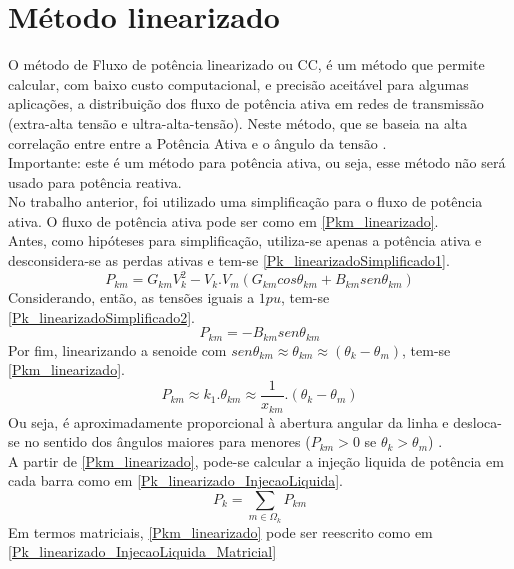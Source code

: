 \section{Método linearizado}
\label{SecaoMetodoLinearizado}
O método de Fluxo de potência linearizado ou CC, é um método que permite calcular, com baixo custo computacional, e precisão aceitável para algumas aplicações, a distribuição dos fluxo de potência ativa em redes de transmissão (extra-alta tensão e ultra-alta-tensão). Neste método, que se baseia na alta correlação entre entre a Potência Ativa e o ângulo da tensão \cite{raphael}.\\
Importante: este é um método para potência ativa, ou seja, esse método não será usado para potência reativa.\\
No trabalho anterior, foi utilizado uma simplificação para o fluxo de potência ativa. O fluxo de potência ativa pode ser como em \ref{Pkm_linearizado}.\\
Antes, como hipóteses para simplificação, utiliza-se apenas a potência ativa e desconsidera-se as perdas ativas e tem-se \ref{Pk_linearizadoSimplificado1}.
\begin{equation}
    P_{km} = G_{km}V^2_{k}-V_k.V_m (G_{km} cos\theta_{km} + B_{km}sen\theta_{km})
    \label{Pk_linearizadoSimplificado1}
\end{equation}
Considerando, então, as tensões iguais a $1pu$, tem-se \ref{Pk_linearizadoSimplificado2}.
\begin{equation}
    P_{km} = -B_{km}sen\theta_{km}
    \label{Pk_linearizadoSimplificado2}
\end{equation}
Por fim, linearizando a senoide com $sen\theta_{km} \approx \theta_{km} \approx (\theta_{k} - \theta_{m})$, tem-se \ref{Pkm_linearizado}.
\begin{equation}
    P_{km} \approx  k_1.\theta_{km} \approx \frac{1}{x_{km}}.(\theta_k - \theta_m)
    \label{Pkm_linearizado}
\end{equation}
Ou seja, é aproximadamente proporcional à abertura angular da linha e desloca-se no sentido dos ângulos maiores para menores ($P_{km}>0$ se $\theta_k > \theta_m$) \cite{castro}.\\
A partir de \ref{Pkm_linearizado}, pode-se calcular a injeção liquida de potência em cada barra como em \ref{Pk_linearizado_InjecaoLiquida}.
\begin{equation}
    P_{k} = \sum_{m\in\Omega_k} P_{km}
    \label{Pk_linearizado_InjecaoLiquida}
\end{equation}
Em termos matriciais, \ref{Pkm_linearizado} pode ser reescrito como em \ref{Pk_linearizado_InjecaoLiquida_Matricial}
